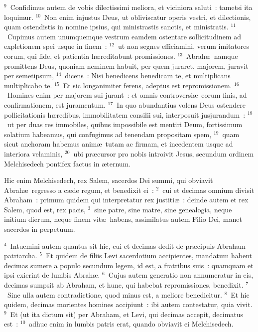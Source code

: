 ${}^{9}$~Confidimus autem de vobis dilectissimi meliora, et viciniora saluti~: tametsi ita loquimur.
${}^{10}$~Non enim injustus Deus, ut obliviscatur operis vestri, et dilectionis, quam ostendistis in nomine ipsius, qui ministrastis sanctis, et ministratis.
${}^{11}$~Cupimus autem unumquemque vestrum eamdem ostentare sollicitudinem ad expletionem spei usque in finem~:
${}^{12}$~ut non segnes efficiamini, verum imitatores eorum, qui fide, et patientia h\ae reditabunt promissiones.
${}^{13}$~Abrah\ae\ namque promittens Deus, quoniam neminem habuit, per quem juraret, majorem, juravit per semetipsum,
${}^{14}$~dicens~: Nisi benedicens benedicam te, et multiplicans multiplicabo te.
${}^{15}$~Et sic longanimiter ferens, adeptus est repromissionem.
${}^{16}$~Homines enim per majorem sui jurant~: et omnis controversi\ae\ eorum finis, ad confirmationem, est juramentum.
${}^{17}$~In quo abundantius volens Deus ostendere pollicitationis h\ae redibus, immobilitatem consilii sui, interposuit jusjurandum~:
${}^{18}$~ut per duas res immobiles, quibus impossibile est mentiri Deum, fortissimum solatium habeamus, qui confugimus ad tenendam propositam spem,
${}^{19}$~quam sicut anchoram habemus anim\ae\ tutam ac firmam, et incedentem usque ad interiora velaminis,
${}^{20}$~ubi pr\ae cursor pro nobis introivit Jesus, secundum ordinem Melchisedech pontifex factus in \ae ternum.

\bchapter
\lettrine[lines=3,image=true,loversize=0.05,lraise=-0.03]{H}{}ic enim Melchisedech, rex Salem, sacerdos Dei summi, qui obviavit Abrah\ae\ regresso a c\ae de regum, et benedixit ei~:
${}^{2}$~cui et decimas omnium divisit Abraham~: primum quidem qui interpretatur rex justiti\ae~: deinde autem et rex Salem, quod est, rex pacis,
${}^{3}$~sine patre, sine matre, sine genealogia, neque initium dierum, neque finem vit\ae\ habens, assimilatus autem Filio Dei, manet sacerdos in perpetuum.


${}^{4}$~Intuemini autem quantus sit hic, cui et decimas dedit de pr\ae cipuis Abraham patriarcha.
${}^{5}$~Et quidem de filiis Levi sacerdotium accipientes, mandatum habent decimas sumere a populo secundum legem, id est, a fratribus suis~: quamquam et ipsi exierint de lumbis Abrah\ae .
${}^{6}$~Cujus autem generatio non annumeratur in eis, decimas sumpsit ab Abraham, et hunc, qui habebat repromissiones, benedixit.
${}^{7}$~Sine ulla autem contradictione, quod minus est, a meliore benedicitur.
${}^{8}$~Et hic quidem, decimas morientes homines accipiunt~: ibi autem contestatur, quia vivit.
${}^{9}$~Et (ut ita dictum sit) per Abraham, et Levi, qui decimas accepit, decimatus est~:
${}^{10}$~adhuc enim in lumbis patris erat, quando obviavit ei Melchisedech.


